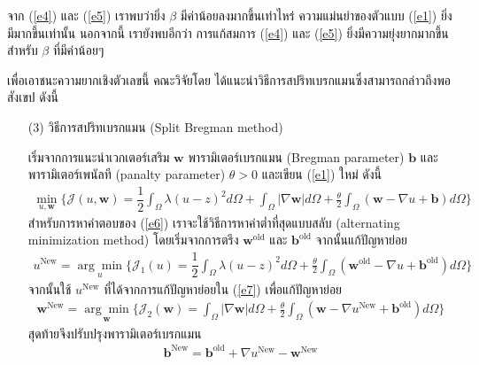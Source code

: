 \documentclass[hidelinks, a4paper,12pt]{article}
\numberwithin{equation}{section}							%
\numberwithin{equation}{section}
\begin{document}
{\hspace{1cm} จาก (\ref{e4}) และ (\ref{e5}) เราพบว่ายิ่ง $\beta$ มีค่าน้อยลงมากขึ้นเท่าไหร่ ความแม่นยำของตัวแบบ (\ref{e1}) ยิ่งมีมากขึ้นเท่านั้น นอกจากนี้ เรายังพบอีกว่า การแก้สมการ (\ref{e4}) และ (\ref{e5}) ยิ่งมีความยุ่งยากมากขึ้นสำหรับ $\beta$ ที่มีค่าน้อยๆ 

\hspace{1cm} เพื่อเอาชนะความยากเชิงตัวเลขนี้ คณะวิจัยโดย \cite{ref:splitbergman-inpaint} ได้แนะนำวิธีการสปริทเบรกแมนซึ่งสามารถกล่าวถึงพอสังเขป ดังนี้

\begin{itemize}
	\item [(3)] วิธีการสปริทเบรกแมน (Split Bregman method)
	
	เริ่มจากการแนะนำเวกเตอร์เสริม $\boldsymbol{w}$ พารามิเตอร์เบรกแมน (Bregman parameter) $\boldsymbol{b}$ และพารามิเตอร์เพนัลที (panalty parameter) $\theta>0$ และเขียน (\ref{e1}) ใหม่ ดังนี้
	\begin{align}
	\min_{u,\boldsymbol{w}} \{ \mathcal{J}(u,\boldsymbol{w}) = \dfrac{1}{2} \int_{\Omega} \lambda(u-z)^2 d\Omega +  \int_{\Omega}  |\nabla \boldsymbol{w}|  d\Omega + \frac{\theta}{2} \int_{\Omega} (\boldsymbol{w} - \nabla u + \boldsymbol{b}) d\Omega \}
	\label{e6}
	\end{align}
	สำหรับการหาคำตอบของ (\ref{e6}) เราจะใช้วิธีการหาค่าต่ำที่สุดแบบสลับ (alternating minimization method) โดยเริ่มจากการตรึง $\boldsymbol{w}^{\text{old}}$ และ $\boldsymbol{b}^{\text{old}}$ จากนั้นแก้ปัญหาย่อย
	\begin{align}
	u^{\text{New}}=\underset{u}{\arg\min} \{ \mathcal{J}_1(u) = \dfrac{1}{2} \int_{\Omega} \lambda(u-z)^2 d\Omega + \frac{\theta}{2} \int_{\Omega} (\boldsymbol{w}^{\text{old}} - \nabla u + \boldsymbol{b}^{\text{old}}) d\Omega \}
	\label{e7}
	\end{align}
	จากนั้นใช้ $u^{\text{New}}$ ที่ได้จากการแก้ปัญหาย่อยใน (\ref{e7}) เพื่อแก้ปัญหาย่อย
	\begin{align}
	\boldsymbol{w}^{\text{New}}=\underset{\boldsymbol{w}}{\arg\min} \{ \mathcal{J}_2(\boldsymbol{w}) = \int_{\Omega}  |\nabla \boldsymbol{w}|  d\Omega  + \frac{\theta}{2} \int_{\Omega} (\boldsymbol{w} - \nabla u^{\text{New}} + \boldsymbol{b}^{\text{old}}) d\Omega \}
	\label{e8}
	\end{align}
	สุดท้ายจึงปรับปรุงพารามิเตอร์เบรกแมน 
	\begin{align}
	\boldsymbol{b}^{\text{New}}=\boldsymbol{b}^{\text{old}}+\nabla u^{\text{New}}-\boldsymbol{w}^{\text{New}}
	\label{e9}
	\end{align}

\end{itemize}}
\end{document}
